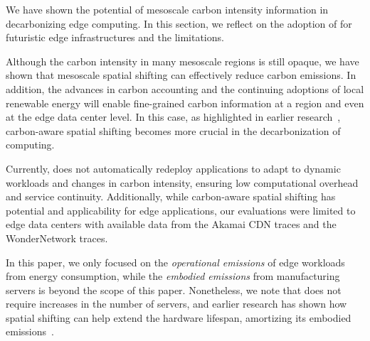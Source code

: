 We have shown the potential of mesoscale carbon intensity information in decarbonizing edge computing. In this section, we reflect on the adoption of \proposedsystem for futuristic edge infrastructures and the limitations.

Although the carbon intensity in many mesoscale regions is still opaque, we have shown that mesoscale spatial shifting can effectively reduce carbon emissions. In addition, the advances in carbon accounting and the continuing adoptions of local renewable energy will enable fine-grained carbon information at a region and even at the edge data center level. In this case, as highlighted in earlier research~\cite{acun2023carbon, Zheng2020:Curtailment, Gsteiger2024:Caribou}, carbon-aware spatial shifting becomes more crucial in the decarbonization of computing.  


 Currently, \proposedsystem does not automatically redeploy applications to adapt to dynamic workloads and changes in carbon intensity, ensuring low computational overhead and service continuity. Additionally, while carbon-aware spatial shifting has potential and applicability for edge applications, our evaluations were limited to edge data centers with available data from the Akamai CDN traces and the WonderNetwork traces\cite{wonder-proxy-2020}.



In this paper, we only focused on the {\em operational emissions} of edge workloads from energy consumption, while the {\em embodied emissions} from manufacturing servers is beyond the scope of this paper\cite{Eeckhout2024:FOCAL, Gupta2022:ACT, Li2023:Toward, Gupta2022:Chasing}. Nonetheless, we note that \proposedsystem does not require increases in the number of servers, and earlier research has shown how spatial shifting can help extend the hardware lifespan, amortizing its embodied emissions~\cite{Liu2024:Relocation, Switzer2023:Junkyard}.

